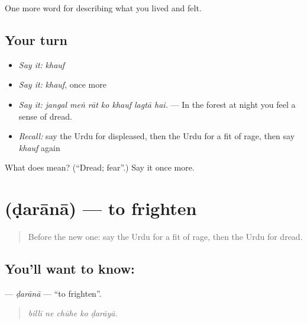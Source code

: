 \begin{grammarlens}[title={What you've built}]
One more word for describing what you lived and felt.
\end{grammarlens}

\subsection*{Your turn}
\begin{itemize}
\raggedright
  \item \emph{Say it:} \emph{khauf}
  \item \emph{Say it:} \emph{khauf}, once more
  \item \emph{Say it:} \emph{jangal meṅ rāt ko khauf lagtā hai.} — In the forest at night you feel a sense of dread.
  \item \emph{Recall:} say the Urdu for displeased, then the Urdu for a fit of rage, then say \emph{khauf} again
\end{itemize}

\begin{tcolorbox}[breakable,colback=teal!4,colframe=teal!35!black,title={Before you move on}]
What does  mean? (\textquotedblleft{}Dread; fear\textquotedblright{}.) Say it once more.
\end{tcolorbox}
\section[\texorpdfstring{\ur{ڈرانا} (ḍarānā)}{ڈرانا (ḍarānā)}]{ (ḍarānā) — to frighten}

\label{lesson:UR-C445-darana}



\begin{quote}
Before the new one: say the Urdu for a fit of rage, then the Urdu for dread.
\end{quote}

\subsection*{You'll want to know: }
\textbf{} — \emph{ḍarānā} — \textquotedblleft{}to frighten\textquotedblright{}.

\begin{quote}
    
\end{quote}

\begin{quote}
\emph{billī ne chūhe ko ḍarāyā.}
\end{quote}

